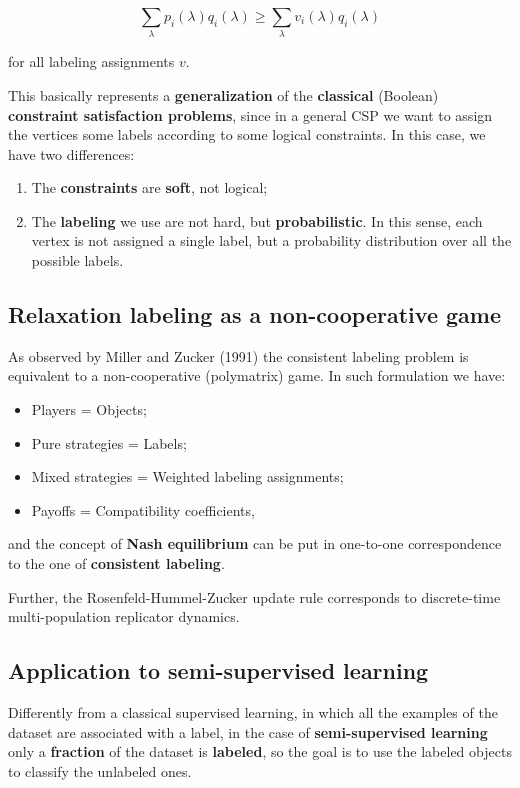 \begin{equation}
    \sum_{\lambda} p_i(\lambda) q_i(\lambda) \geq \sum_{\lambda} v_i(\lambda) q_i(\lambda)
\end{equation}

for all labeling assignments $v$.

This basically represents a \textbf{generalization} of the \textbf{classical} (Boolean) \textbf{constraint satisfaction problems}, since in a general CSP we want to assign the vertices some labels according to some logical constraints. In this case, we have two differences:

\begin{enumerate}
    \item The \textbf{constraints} are \textbf{soft}, not logical;
    \item The \textbf{labeling} we use are not hard, but \textbf{probabilistic}. In this sense, each vertex is not assigned a single label, but a probability distribution over all the possible labels.
\end{enumerate}

\subsection{Relaxation labeling as a non-cooperative game}
As observed by Miller and Zucker (1991) the consistent labeling problem is equivalent to a non-cooperative (polymatrix) game. In such formulation we have:

\begin{itemize}
    \item Players = Objects;
    \item Pure strategies = Labels;
    \item Mixed strategies = Weighted labeling assignments;
    \item Payoffs = Compatibility coefficients,
\end{itemize}

and the concept of \textbf{Nash equilibrium} can be put in one-to-one correspondence to the one of \textbf{consistent labeling}.

Further, the Rosenfeld-Hummel-Zucker update rule corresponds to discrete-time
multi-population replicator dynamics.

\subsection{Application to semi-supervised learning}
Differently from a classical supervised learning, in which all the examples of the dataset are associated with a label, in the case of \textbf{semi-supervised learning} only a \textbf{fraction} of the dataset is \textbf{labeled}, so the goal is to use the labeled objects to classify the unlabeled ones.

